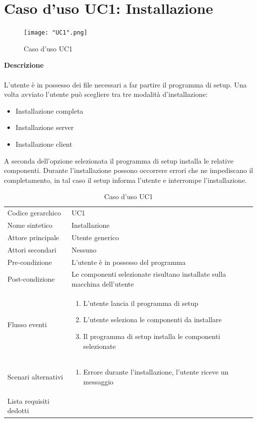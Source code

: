 \documentclass[a4paper]{report}
\begin{document}
		\section{Caso d'uso UC1: Installazione}
			\begin{figure}[H]
				\centering
				\texttt{[image: "UC1".png]}
				\caption{Caso d'uso UC1}
			\end{figure}
		 \textbf{Descrizione} \\ \\
		 L'utente è in possesso dei file necessari a far partire il programma di setup. Una volta avviato
		  l'utente può scegliere tra tre modalità d'installazione: 
		 \begin{itemize}
		 	\item Installazione completa
		 	\item Installazione server
		 	\item Installazione client
		 \end{itemize}
		 A seconda dell'opzione selezionata il programma di setup installa le relative componenti. Durante 
		 l'installazione possono occorrere errori che ne impediscano il completamento, in tal caso il setup
		 informa l'utente e interrompe l'installazione.
			\begin{table}[H]
			\begin{tabularx}{\textwidth}{X | X}\toprule
				\rowcolor{orange!65}Codice gerarchico & UC1 \\
				Nome sintetico & Installazione \\
				\rowcolor{orange!65}Attore principale & Utente generico\\
				Attori secondari & Nessuno \\
				\rowcolor{orange!65}Pre-condizione & L'utente è in possesso del programma \\
				Post-condizione & Le componenti selezionate risultano installate sulla
				 macchina dell'utente \\
				\rowcolor{orange!65}Flusso eventi & \begin{enumerate}
				\item L'utente lancia il programma di setup
				\item L'utente seleziona le componenti da installare
				\item Il programma di setup installa le componenti selezionate
				\end{enumerate} \\
				Scenari alternativi & \begin{enumerate}
				\item Errore durante l'installazione, l'utente riceve un messaggio
				\end{enumerate} \\
				\rowcolor{orange!65}Lista requisiti dedotti & \\
				\bottomrule
			\end{tabularx}
			\caption{Caso d'uso UC1}
		 \end{table}
\end{document}
